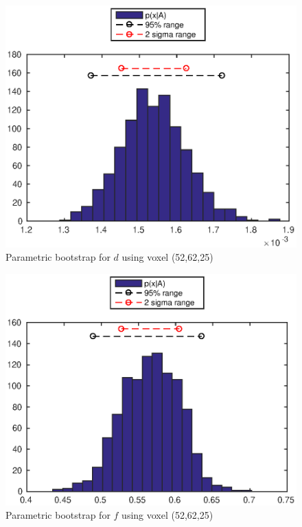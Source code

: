 \documentclass[11pt,a4paper,oneside]{report}
\begin{document}
\begin{figure}[H]
      \centering
    \includegraphics[scale=1]{figures/q2/q121-p2.eps}
    \caption{Parametric bootstrap for $d$ using voxel (52,62,25)}
    \label{q121-p2}
\end{figure}

\begin{figure}[H]
      \centering
    \includegraphics[scale=1]{figures/q2/q121-p3.eps}
    \caption{Parametric bootstrap for $f$ using voxel (52,62,25)}
    \label{q121-p3}
\end{figure}
\end{document}
